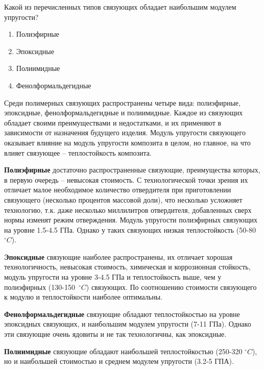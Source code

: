 
Какой из перечисленных типов связующих обладает наибольшим модулем упругости?

\begin{enumerate}
    \item Полиэфирные
    \item Эпоксидные
    \item Полиимидные
    \item Фенолформальдегидные
\end{enumerate}

\explanationSection

Среди полимерных связующих распространены четыре вида: полиэфирные, эпоксидные, фенолформальдегидные и 
полиимидные. Каждое из связующих обладает своими преимуществами и недостатками, и их применяют в зависимости от 
назначения будущего изделия. Модуль упругости связующего оказывает влияние на модуль упругости композита в целом, 
но главное, на что влияет связующее – теплостойкость композита.

\textbf{Полиэфирные} достаточно распространенные связующие, преимущества которых, в первую очередь – 
невысокая стоимость. С технологической точки зрения их отличает малое необходимое количество отвердителя 
при приготовлении связующего (несколько процентов массовой доли), что несколько усложняет технологию, т.к. 
даже несколько миллилитров отвердителя, добавленных сверх нормы изменят режим отверждения. Модуль упругости 
полиэфирных связующих на уровне 1.5-4.5 ГПа. Однако у таких связующих низкая теплостойкость (50-80 $^\circ C$).

\textbf{Эпоксидные} связующие наиболее распространены, их отличает хорошая технологичность, невысокая 
стоимость, химическая и коррозионная стойкость, модуль упругости на уровне 3-4.5 ГПа и теплостойкость выше, 
чем у полиэфирных (130-150~$^\circ C$) связующих. По соотношению стоимости связующего к модулю и теплостойкости наиболее оптимальны.

\textbf{Фенолформальдегидные} связующие обладают теплостойкостью на уровне эпоксидных связующих, и наибольшим модулем упругости (7-11 ГПа). Однако эти связующие очень ядовиты и не так технологичны, как эпоксидные.

\textbf{Полиимидные} связующие обладают наибольшей теплостойкостью (250-320 $^\circ C$), но и наибольшей 
стоимостью и среднем модулем упругости (3.2-5 ГПА).

